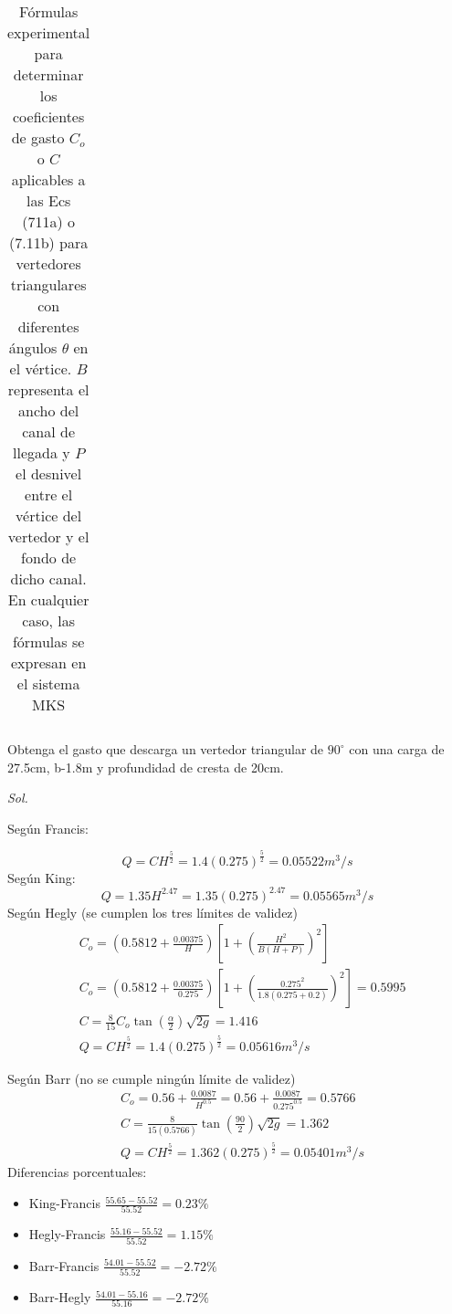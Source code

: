 \begin{table}[h!]
\begin{turn}{90}
\begin{tabular}{@{}cccc@{}}
    \end{tabular}
    \end{turn}
    \caption{Fórmulas experimental para determinar los coeficientes de gasto $C_o$ o $C$ aplicables a las Ecs (711a) o (7.11b) para vertedores triangulares con diferentes ángulos $\theta$ en el vértice. $B$ representa el ancho del canal de llegada y $P$ el desnivel entre el vértice del vertedor y el fondo de dicho canal. En cualquier caso, las fórmulas se expresan en el sistema MKS}
    \label{tabhb45}
\end{table}
\begin{example}
    Obtenga el gasto que descarga un vertedor triangular de $90^{\circ}$ con una carga de 27.5cm, b-1.8m y profundidad de cresta de 20cm.
\end{example}
    
    \textit{ Sol. }
    
    Según Francis:
    
    \begin{equation*}
        Q = CH^{\frac{5}{2}} = 1.4(0.275)^{\frac{5}{2}} = 0.05522 m^3/s
    \end{equation*}
    Según King:
    \begin{equation*}
        Q = 1.35H^{2.47} =1.35(0.275)^{2.47} = 0.05565 m^3/s
    \end{equation*}
    Según Hegly (se cumplen los tres límites de validez)
    \begin{align*}
        &C_o = \left(0.5812 + \frac{0.00375}{H}\right)\left[1 +\left(\frac{H^2}{B(H + P)}\right)^2\right]\\
        &C_o = \left(0.5812 + \frac{0.00375}{0.275}\right)\left[1 +\left(\frac{0.275^2}{1.8(0.275 + 0.2)}\right)^2\right] = 0.5995\\
        &C = \frac{8}{15}C_o \tan{\left(\frac{\alpha}{2}\right)} \sqrt{2g} = 1.416\\
        &Q = CH^{\frac{5}{2}} = 1.4(0.275)^{\frac{5}{2}} = 0.05616 m^3/s
    \end{align*}
    
    Según Barr (no se cumple ningún límite de validez)
    \begin{align*}
        &C_o = 0.56 + \frac{0.0087}{H^{0.5}} = 0.56  + \frac{0.0087}{0.275^{0.5}} =0. 5766\\
        &C = \frac{8}{15(0.5766)}\tan{\left(\frac{90}{2}\right)} \sqrt{2g} = 1.362\\
        &Q = CH^{\frac{5}{2}} = 1.362(0.275)^{\frac{5}{2}} = 0.05401 m^3/s
    \end{align*}
    Diferencias porcentuales:
    \begin{itemize}
        \item King-Francis $\frac{55.65-55.52}{55.52}=0.23\%$
        \item Hegly-Francis $\frac{55.16-55.52}{55.52}=1.15\%$
        \item Barr-Francis $\frac{54.01-55.52}{55.52}=-2.72\%$
        \item Barr-Hegly $\frac{54.01-55.16}{55.16}=-2.72\%$
    \end{itemize}
    
